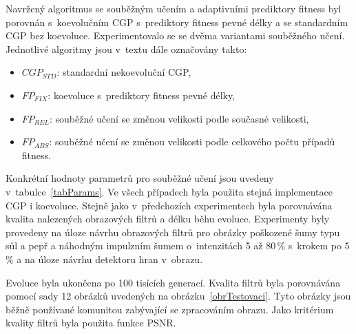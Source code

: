 Navržený algoritmus se souběžným učením a adaptivními prediktory fitness byl porovnán s~koevolučním CGP s~prediktory fitness pevné délky a se standardním CGP bez koevoluce. Experimentovalo se se dvěma variantami souběžného učení. Jednotlivé algoritmy jsou v~textu dále označovány takto:

\begin{itemize}
    \item $\mathit{CGP_{STD}}$: standardní nekoevoluční CGP,
    \item $\mathit{FP_{FIX}}$: koevoluce s~prediktory fitness pevné délky,
    \item $\mathit{FP_{REL}}$: souběžné učení se změnou velikosti podle současné velikosti,
    \item $\mathit{FP_{ABS}}$: souběžné učení se změnou velikosti podle celkového počtu případů fitness.
\end{itemize}

Konkrétní hodnoty parametrů pro souběžné učení jsou uvedeny v~tabulce~\ref{tabParams}. Ve všech případech byla použita stejná implementace CGP i koevoluce. Stejně jako v~předchozích experimentech byla porovnávána kvalita nalezených obrazových filtrů a délku běhu evoluce. Experimenty byly provedeny na úloze návrhu obrazových filtrů pro obrázky poškozené šumy typu sůl a pepř a náhodným impulzním šumem o~intenzitách 5 až 80\,\% s~krokem po 5\,\% a na úloze návrhu detektoru hran v~obrazu.

Evoluce byla ukončena po 100 tisících generací. Kvalita filtrů byla porovnávána pomocí sady 12 obrázků uvedených na obrázku~\ref{obrTestovaci}. Tyto obrázky jsou běžně používané komunitou zabývající se zpracováním obrazu. Jako kritérium kvality filtrů byla použita funkce PSNR.


